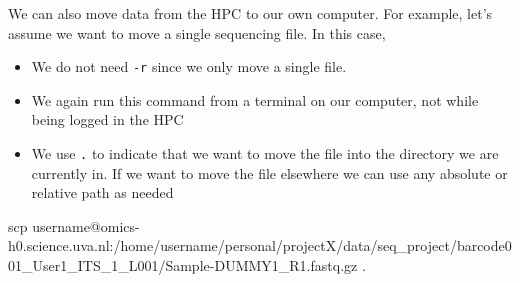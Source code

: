 \documentclass[
  letterpaper,
  DIV=11,
  numbers=noendperiod]{scrreprt}
\newenvironment{Shaded}{}{}
\newcommand{\FunctionTok}[1]{\textcolor[rgb]{0.44,0.26,0.76}{#1}}
\newcommand{\NormalTok}[1]{\textcolor[rgb]{0.14,0.16,0.18}{#1}}
\providecommand{\tightlist}{%
  \setlength{\itemsep}{0pt}\setlength{\parskip}{0pt}}\usepackage{longtable,booktabs,array}
\begin{document}
\begin{tcolorbox}[enhanced jigsaw, coltitle=black, leftrule=.75mm, colback=white, toptitle=1mm, breakable, toprule=.15mm, colbacktitle=quarto-callout-tip-color!10!white, bottomtitle=1mm, arc=.35mm, opacitybacktitle=0.6, bottomrule=.15mm, titlerule=0mm, title=\textcolor{quarto-callout-tip-color}{\faLightbulb}\hspace{0.5em}{Tip: moving data from the HPC to our own computer}, rightrule=.15mm, left=2mm, colframe=quarto-callout-tip-color-frame, opacityback=0]

We can also move data from the HPC to our own computer. For example,
let's assume we want to move a single sequencing file. In this case,

\begin{itemize}
\tightlist
\item
  We do not need \texttt{-r} since we only move a single file.
\item
  We again run this command from a terminal on our computer, not while
  being logged in the HPC
\item
  We use \texttt{.} to indicate that we want to move the file into the
  directory we are currently in. If we want to move the file elsewhere
  we can use any absolute or relative path as needed
\end{itemize}

\begin{Shaded}
\begin{Highlighting}[]
\FunctionTok{scp}\NormalTok{ username@omics{-}h0.science.uva.nl:/home/username/personal/projectX/data/seq\_project/barcode001\_User1\_ITS\_1\_L001/Sample{-}DUMMY1\_R1.fastq.gz .}
\end{Highlighting}
\end{Shaded}

\end{tcolorbox}
\end{document}
